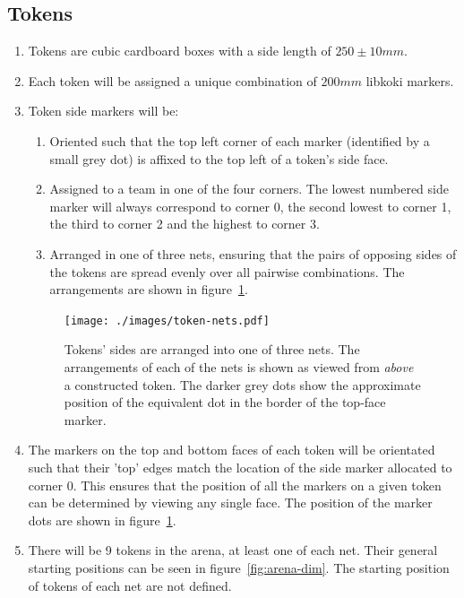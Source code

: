 \subsection{Tokens}
\label{sub:Tokens}
\begin{enumerate}
\item Tokens are cubic cardboard boxes with a side length of $250 \pm 10 mm$.

\item Each token will be assigned a unique combination of $200mm$ libkoki markers.

\item Token side markers will be:
    \begin{enumerate}
    \item Oriented such that the top left corner of each marker (identified by a small grey dot) is affixed to the top left of a token's side face.

    \item Assigned to a team in one of the four corners.
          The lowest numbered side marker will always correspond to corner 0, the second lowest to corner 1, the third to corner 2 and the highest to corner 3.

    \item Arranged in one of three nets, ensuring that the pairs of opposing sides of the tokens are spread evenly over all pairwise combinations.
          The arrangements are shown in figure~\ref{fig:token-nets}.
    \end{enumerate}

\begin{figure}
  \centering
  \texttt{[image: ./images/token-nets.pdf]}
  \caption{Tokens' sides are arranged into one of three nets.
           The arrangements of each of the nets is shown as viewed from \textit{above} a constructed token.
           The darker grey dots show the approximate position of the equivalent dot in the border of the top-face marker.}
  \label{fig:token-nets}
\end{figure}

\item The markers on the top and bottom faces of each token will be orientated such that their 'top' edges match the location of the side marker allocated to corner 0.
      This ensures that the position of all the markers on a given token can be determined by viewing any single face.
      The position of the marker dots are shown in figure~\ref{fig:token-nets}.

\item There will be 9 tokens in the arena, at least one of each net.
      Their general starting positions can be seen in figure~\ref{fig:arena-dim}.
      The starting position of tokens of each net are not defined.


\end{enumerate}
